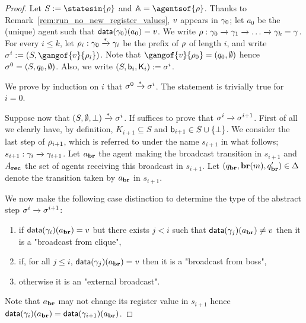 \begin{proof}
	Let $\covset := \statesin{\run}$ and $\agents = \agentsof{\run}$.	
	Thanks to Remark~\ref{rem:run_no_new_register_values},  $v$ appears in $\gamma_0$; let $a_0$ be the (unique) agent such that $\mathsf{data}(\gamma_0)(a_0) = v$. We write $\rho : \gamma_0 \xrightarrow{} \gamma_1 \xrightarrow{} \dots \xrightarrow{} \gamma_k = \gamma$. For every $i \leq k$, let $\rho_i : \gamma_0 \xrightarrow{*} \gamma_i$ be the prefix of $\rho$ of length $i$, and write $\aconfig^i := (\covset, \gangof{\aval}{\run_i})$. Note that $\gangof{\aval}{\run_0} = (q_0, \emptyset)$ hence $\sigma^0 = (S, q_0, \emptyset)$. Also, we write $(S, \mathsf{b}_i, \mathsf{K}_i) := \sigma^i$.
	
	We prove by induction on $i$ that $\sigma^0 \xrightarrow{*} \sigma^i$.
	The statement is trivially true for $i =0$. 
	
	Suppose now that $(S, \emptyset, \bot) \xrightarrow{*} \sigma^i$. 
	If suffices to prove that $\sigma^i \xrightarrow{} \sigma^{i+1}$. First of all we clearly have, by definition, $K_{i+1} \subseteq S$ and $\mathsf{b}_{i+1}\in S\cup\{\bot\}$. We consider the last step of $\rho_{i+1}$, which is referred to under the name $s_{i+1}$ in what follows; $s_{i+1}: \gamma_i \xrightarrow{} \gamma_{i+1}$. Let $a_{\textbf{br}}$ the agent making the broadcast transition in $s_{i+1}$ and $A_{\textbf{rec}}$ the set of agents receiving this broadcast in $s_{i+1}$. Let $(q_{\textbf{br}}, \textbf{br}(m), q_{\textbf{br}}') \in \Delta$ denote the transition taken by $a_{\textbf{br}}$ in $s_{i+1}$.
	
	We now make the following case distinction to determine the type of the abstract step $\sigma^i \xrightarrow{} \sigma^{i+1}$:
	\begin{enumerate}
		\item\label{proof_completeness:case_broadcast_clique} if $\mathsf{data}(\gamma_{i})(a_{\textbf{br}}) = v$ but there exists $j<i$ such that $\mathsf{data}(\gamma_{j})(a_{\textbf{br}}) \ne v$ then it is a "broadcast from clique",
		\item\label{proof_completeness:case_broadcast_boss} if, for all $j \leq i$, $\mathsf{data}(\gamma_j)(a_{\textbf{br}}) = v$ then it is a "broadcast from boss",
		\item\label{proof_completeness:case_external_broadcast} otherwise it is an "external broadcast". 
	\end{enumerate}
	Note that $a_{\textbf{br}}$ may not change its register value in $s_{i+1}$ hence $\mathsf{data}(\gamma_i)(a_{\textbf{br}}) = \mathsf{data}(\gamma_{i+1})(a_{\textbf{br}})$. 
	

\end{proof}
